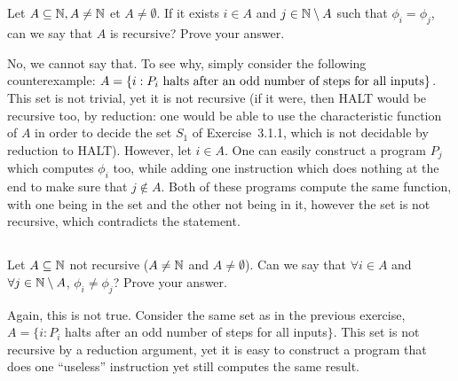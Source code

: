 \subsection{} %
Let \(A \subseteq \mathbb{N}, A \ne \mathbb{N}\) et \(A \ne \emptyset\).
If it exists \(i \in A\) and \(j \in \mathbb{N} \setminus A\)
such that \(\phi_i = \phi_j\),
can we say that \(A\) is recursive? Prove your answer.

\begin{solution}
	No, we cannot say that.
	To see why, simply consider
	the following counterexample:
	\(A = \{i :
	P_i \textnormal{ halts after an odd number of steps for all inputs}\}\).
	This set is not trivial, yet it is not recursive
	(if it were, then HALT would be recursive too, by reduction:
	one would be able to use the characteristic function of \(A\)
	in order to decide the set \(S_1\) of Exercise~3.1.1,
	which is not decidable by reduction to HALT).
	However, let \(i \in A\).
	One can easily construct a program \(P_j\)
	which computes \(\phi_i\) too,
	while adding one instruction which does nothing at the end
	to make sure that \(j \notin A\).
	Both of these programs compute the same function,
	with one being in the set and the other not being in it,
	however the set is not recursive, which contradicts the statement.
\end{solution}

\subsection{} %
Let \(A \subseteq \mathbb{N}\) not recursive (\(A \ne \mathbb{N}\) and \(A \ne \emptyset\)).
Can we say that \(\forall i \in A\) and \(\forall j \in \mathbb{N} \setminus A\),
\(\phi_i \ne \phi_j\)? Prove your answer.

\begin{solution}
	Again, this is not true.
	Consider the same set as in the previous exercise,
	\(A = \{i :
	P_i\) halts after an odd number of steps for all inputs\(\}\).
	This set is not recursive by a reduction argument,
	yet it is easy to construct a program that does
	one ``useless'' instruction yet still computes the same result.
\end{solution}

